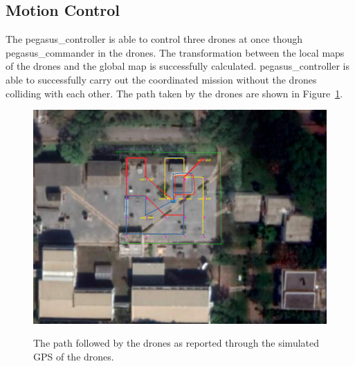 \subsection{Motion Control}
The pegasus\_controller is able to control three drones at once though pegasus\_commander in the drones. The transformation between the local maps of the drones and the global map is successfully calculated. pegasus\_controller is able to successfully carry out the coordinated mission without the drones colliding with each other.  The path taken by the drones are shown in Figure~\ref{fig:simulated-path}.

\begin{figure}
	\centering
	\caption[The path followed by the drones as reported through the simulated GPS of the drones.]{\small The path followed by the drones as reported through the simulated GPS of the drones.} 
	\includegraphics[width=5in]{figures/experiment/simulated-path}
	\label{fig:simulated-path}
\end{figure}

